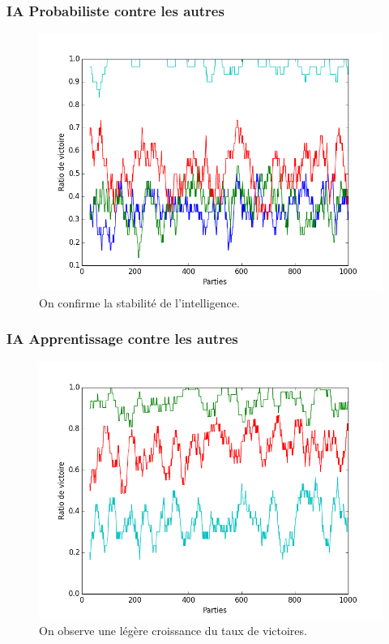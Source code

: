 \documentclass{beamer}
\begin{document}
\begin{frame}
  \frametitle{IA Probabiliste contre les autres}
  \begin{figure}
    \includegraphics[scale=0.4]{plot/stats}
    \caption{
      \label{fig_stats} On confirme la stabilité de l'intelligence.
    }
  \end{figure}
\end{frame}

\begin{frame}
  \frametitle{IA Apprentissage contre les autres}
  \begin{figure}
    \includegraphics[scale=0.4]{plot/eleve}
    \caption{
      \label{fig_eleve} On observe une légère croissance du taux de victoires.
    }
  \end{figure}
\end{frame}
\end{document}
